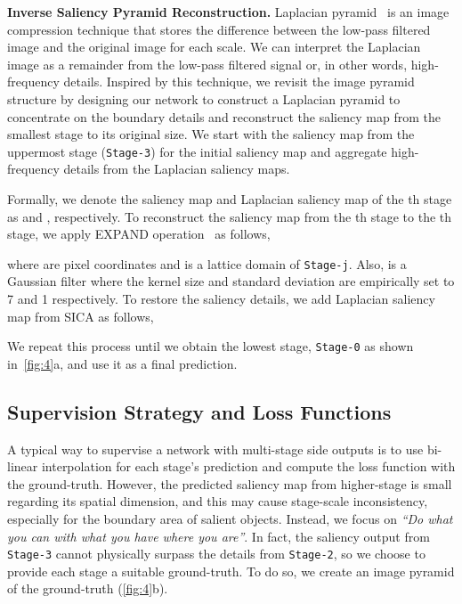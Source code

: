 \documentclass{llncs}
\begin{document}
        \noindent
        \textbf{Inverse Saliency Pyramid Reconstruction.}
        \label{sec:met.3}
        Laplacian pyramid~\cite{burt1983laplacian} is an image compression technique that stores the difference between the low-pass filtered image and the original image for each scale. 
        We can interpret the Laplacian image as a remainder from the low-pass filtered signal or, in other words, high-frequency details. 
        Inspired by this technique, we revisit the image pyramid structure by designing our network to construct a Laplacian pyramid to concentrate on the boundary details and reconstruct the saliency map from the smallest stage to its original size. 
        We start with the saliency map from the uppermost stage (\texttt{Stage-3}) for the initial saliency map and aggregate high-frequency details from the Laplacian saliency maps. 

        Formally, we denote the saliency map and Laplacian saliency map of the th stage as  and , respectively. 
        To reconstruct the saliency map from the th stage to the th stage, we apply EXPAND operation~\cite{burt1983laplacian} as follows,
        
        where  are pixel coordinates and  is a lattice domain of \texttt{Stage-j}. 
        Also,  is a Gaussian filter where the kernel size and standard deviation are empirically set to 7 and 1 respectively.
        To restore the saliency details, we add Laplacian saliency map from SICA as follows,
        
        We repeat this process until we obtain the lowest stage, \texttt{Stage-0} as shown in~\cref{fig:4}a, and use it as a final prediction.
        
        \subsection{Supervision Strategy and Loss Functions}
        \label{sec:met.4}
        A typical way to supervise a network with multi-stage side outputs is to use bi-linear interpolation for each stage's prediction and compute the loss function with the ground-truth. 
        However, the predicted saliency map from higher-stage is small regarding its spatial dimension, and this may cause stage-scale inconsistency, especially for the boundary area of salient objects. 
        Instead, we focus on \textit{“Do what you can with what you have where you are''}.
        In fact, the saliency output from \texttt{Stage-3} cannot physically surpass the details from \texttt{Stage-2}, so we choose to provide each stage a suitable ground-truth. 
        To do so, we create an image pyramid of the ground-truth (\cref{fig:4}b).
        
\end{document}
